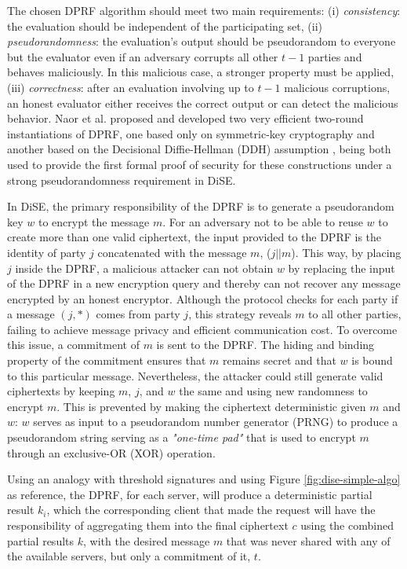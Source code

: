 The chosen DPRF algorithm should meet two main requirements: (i) \textit{consistency}: the evaluation should be independent of the participating set, (ii) \textit{pseudorandomness}: the evaluation's output should be pseudorandom to everyone but the evaluator even if an adversary corrupts all other $t - 1$ parties and behaves maliciously. In this malicious case, a stronger property must be applied, (iii) \textit{correctness}: after an evaluation involving up to $t - 1$ malicious corruptions, an honest evaluator either receives the correct output or can detect the malicious behavior. Naor et al. \cite{naor} proposed and developed two very efficient two-round instantiations of DPRF, one based only on symmetric-key cryptography and another based on the Decisional Diffie-Hellman (DDH) assumption \cite{ddh}, being both used to provide the first formal proof of security for these constructions under a strong pseudorandomness requirement in DiSE.

In DiSE, the primary responsibility of the DPRF is to generate a pseudorandom key $w$ to encrypt the message $m$. For an adversary not to be able to reuse $w$ to create more than one valid ciphertext, the input provided to the DPRF is the identity of party $j$ concatenated with the message $m$, ($j||m$). 
This way, by placing $j$ inside the DPRF, a malicious attacker can not obtain $w$ by replacing the input of the DPRF in a new encryption query and thereby can not recover any message encrypted by an honest encryptor. Although the protocol checks for each party if a message $(j, \ast)$ comes from party $j$, this strategy reveals $m$ to all other parties, failing to achieve message privacy and efficient communication cost. To overcome this issue, a commitment of $m$ is sent to the DPRF. The hiding and binding property of the commitment ensures that $m$ remains secret and that $w$ is bound to this particular message. Nevertheless, the attacker could still generate valid ciphertexts by keeping $m$, $j$, and $w$ the same and using new randomness to encrypt $m$. This is prevented by making the ciphertext deterministic given $m$ and $w$: $w$ serves as input to a pseudorandom number generator (PRNG) to produce a pseudorandom string serving as a \textit{"one-time pad"} that is used to encrypt $m$ through an exclusive-OR (XOR) operation. 

Using an analogy with threshold signatures and using Figure \ref{fig:dise-simple-algo} as reference, the DPRF, for each server, will produce a deterministic partial result $k_i$, which the corresponding client that made the request will have the responsibility of aggregating them into the final ciphertext $c$ using the combined partial results $k$, with the desired message $m$ that was never shared with any of the available servers, but only a commitment of it, $t$.

